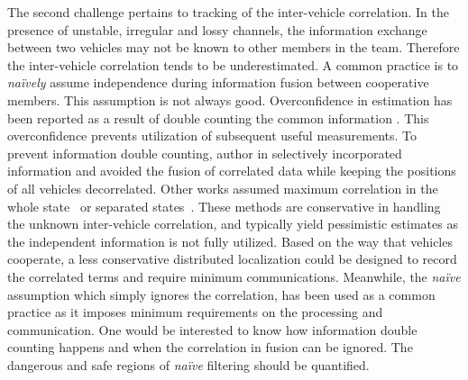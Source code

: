 The second challenge pertains to tracking of the inter-vehicle correlation. In the presence of unstable, irregular and lossy channels, the information exchange between two vehicles may not be known to other members in the team. Therefore the inter-vehicle correlation tends to be underestimated. A common practice is to \textit{na\"ively} assume independence during information fusion between cooperative members. This assumption is not always good. Overconfidence in estimation has been reported as a result of double counting the common information \cite{Julier2001book}. This overconfidence prevents utilization of subsequent useful measurements. To prevent information double counting, author in \cite{BahrThesis} selectively incorporated information and avoided the fusion of correlated data while keeping the positions of all vehicles decorrelated. Other works assumed maximum correlation in the whole state~\cite{Uhlmann2003,Benaskeur2002,Yan2008} or separated states~\cite{LiHao2013B}. These methods are conservative in handling the unknown inter-vehicle correlation, and typically yield pessimistic estimates as the independent information is not fully utilized. Based on the way that vehicles cooperate, a less conservative distributed localization could be designed to record the correlated terms and require minimum communications. Meanwhile, the \textit{na\"ive} assumption which simply ignores the correlation, has been used as a common practice as it imposes minimum requirements on the processing and communication. One would be interested to know how information double counting happens and when the correlation in fusion can be ignored. The dangerous and safe regions of \textit{na\"ive} filtering should be quantified.


